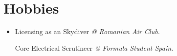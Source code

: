 \documentclass[letterpaper,11pt]{article}
\makeatletter
\newcommand{\resumeOrganizationHeading}[4]{
  \vspace{-2pt}\item
    \begin{tabular*}{0.97\textwidth}[t]{l@{\extracolsep{\fill}}r}
      \textbf{#1} & \textit{\small #2} \\
      \textit{\small#3}
    \end{tabular*}\vspace{-7pt}
}
\newcommand{\resumeSubHeadingListStart}{\begin{itemize}[leftmargin=0.15in, label={}]}
\newcommand{\resumeSubHeadingListEnd}{\end{itemize}}
\makeatother
\begin{document}

\section{Hobbies}
  \resumeSubHeadingListStart

    \item{
      Licensing as an Skydiver \textit{@ Romanian Air Club.}
      
      Core Electrical Scrutineer \textit{@ Formula Student Spain.}
      

    }

  \resumeSubHeadingListEnd




    
    


\end{document}
